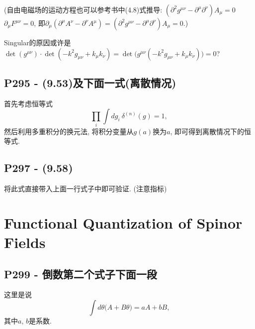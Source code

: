 (自由电磁场的运动方程也可以参考书中(4.8)式推导: $(\partial^2 g^{\mu\nu} - \partial^\mu \partial^\nu)A_\mu  = 0$$\partial_\mu F^{\mu\nu} = 0$, 即$\partial_\mu (\partial^\mu A^\nu - \partial^\nu A^\mu) = (\partial^2 g^{\mu\nu} - \partial^\mu \partial^\nu)A_\mu  = 0$.)

  Singular的原因或许是$\det{(g^{\mu\nu})}\cdot \det{(-k^2g_{\mu\nu}+k_\mu k_\nu)} = \det{\bigl(g^{\mu\nu}(-k^2g_{\mu\nu}+k_\mu k_\nu)\bigr)} = 0$?

  \subsection{P295 - (9.53)及下面一式(离散情况)}

  首先考虑恒等式
  \begin{equation}
    \prod_{i} \int dg_i\ \delta^{(n)}(g) = 1,
  \end{equation}
  然后利用多重积分的换元法, 将积分变量从$g(a)$换为$a$, 即可得到离散情况下的恒等式.


  \subsection{P297 - (9.58)}

  将此式直接带入上面一行式子中即可验证. (注意指标)

  \section{Functional Quantization of Spinor Fields}

  \subsection{P299 - 倒数第二个式子下面一段}
  这里是说
  \begin{equation}
    \int d\theta\bigl(A+B\theta\bigr) = aA + bB,
  \end{equation}
  其中$a$, $b$是系数.

